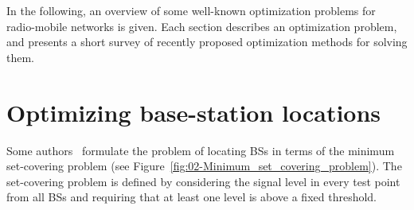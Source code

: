 \bigskip{}


In the following, an overview of some well-known optimization problems
for radio-mobile networks is given. Each section describes an optimization
problem, and presents a short survey of recently proposed optimization
methods for solving them.


\section{Optimizing base-station locations}

Some authors~\cite{minimum.set.covering.problem:1997,minimum.set.covering.problem:2000}
formulate the problem of locating BSs in terms of the minimum set-covering
problem (see Figure~\ref{fig:02-Minimum_set_covering_problem}).
The set-covering problem is defined by considering the signal level
in every test point from all BSs and requiring that at least one level
is above a fixed threshold.

